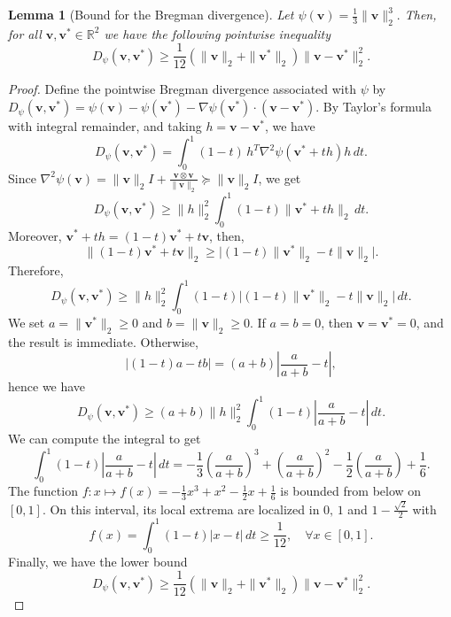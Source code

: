 \documentclass[11pt]{article}
\newtheorem{lemma}[theorem]{Lemma}
\newcommand{\bv}{\mathbf{v}}
\begin{document}
\begin{lemma}[Bound for the Bregman divergence]
\label{lemma: bound Bregman}
Let $\psi(\bv)=\frac13 \|\bv\|_2^3.$
Then, for all \(\bv,\bv^*\in\mathbb R^2\) we have the following pointwise inequality
\[
    D_\psi(\bv,\bv^*)
    \geq
    \frac1{12}
    \left (\|\bv\|_2+\|\bv^*\|_2\right )\|\bv -\bv^*\|_2^2.
\]
\end{lemma}
\begin{proof}
Define the pointwise Bregman divergence associated with \(\psi\) by $ D_\psi(\bv,\bv^*)
    =
    \psi(\bv)-\psi(\bv^*)-\nabla\psi(\bv^*)\cdot(\bv-\bv^*).$
By Taylor's formula with integral remainder, and taking $h=\bv-\bv^*$, we have
\[
    D_\psi(\bv,\bv^*)
    =
    \int_0^1
    (1-t)\,
    h^T\nabla^2\psi(\bv^*+th)h\,dt.
\]
Since $\nabla^2\psi(\bv)=
    \|\bv\|_2 I+\frac{\bv\otimes \bv}{\|\bv\|_2} \succeq
    \|\bv\|_2 I$, we get
$$
    D_\psi(\bv,\bv^*)\geq \|h\|_2^2 \int_0^1
    (1-t)\|\bv^*+t h\|_2\,dt.
$$
Moreover, $\bv^*+t h=(1-t)\bv^*+t \bv$, then,
\[
\|(1-t)\bv^*+t\bv\|_2 \geq \bigl| (1-t) \|\bv^*\|_2-t\|\bv\|_2 \bigr|.
\]
Therefore,
\[
    D_\psi(\bv,\bv^*)
    \geq
    \|h\|_2^2 \int_0^1 (1-t)
    \bigl| (1-t)\|\bv^*\|_2-t\|\bv\|_2 \bigr|\,dt.
\]
We set $a=\|\bv^*\|_2\ge 0$ and $b=\| \bv\|_2 \ge0$.
If \(a=b=0\), then \(\bv=\bv^*=0\), and the result is immediate. Otherwise,
\[
    \bigl| (1-t)a-tb \bigr|
    =
    (a+b)\left| \frac{a}{a+b}-t\right|,
\]
hence we have
\[
    D_\psi(\bv,\bv^*)
    \geq
    (a+b)\|h\|_2^2
    \int_0^1
    (1-t)\left |\frac{a}{a+b}-t\right |\,dt.
\]
We can compute the integral to get
\[
    \int_0^1
    (1-t)\left |\frac{a}{a+b}-t\right |\,dt
    =
    -\frac{1}{3}\left (\frac{a}{a+b}\right )^3
    +\left (\frac{a}{a+b}\right )^2
    -\frac{1}{2} \left (\frac{a}{a+b}\right )
    +\frac16.
\]
The function $f: x \mapsto f(x) = -\frac{1}{3}x^3+x^2-\frac{1}{2} x+\frac16$ is bounded from below on \( [0,1]\). On this interval, its local extrema are localized in $0,\, 1$ and $1- \frac{\sqrt{2}}{2}$ with
\[f(x) = \int_0^1(1-t)|x-t|\,dt \geq \frac1{12},\quad \forall x\in [0, 1].
\]
Finally, we have the lower bound
\[
    D_\psi(\bv,\bv^*)
    \geq
    \frac1{12}
    \left (\|\bv\|_2+\|\bv^*\|_2\right )\|\bv -\bv^*\|_2^2.
\]
\end{proof}
\end{document}
